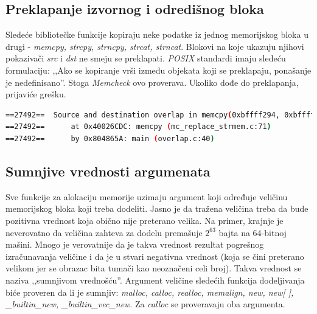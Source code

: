 \documentclass[12pt,oneside]{memoir}
\theoremstyle{plain}
\theoremstyle{definition}
\begin{document}
\subsection{Preklapanje izvornog i odredišnog bloka}
Sledeće bibliotečke funkcije kopiraju neke podatke iz jednog memorijskog bloka u drugi - \textit{memcpy, strcpy, strncpy, strcat, strncat}.  Blokovi na koje ukazuju njihovi pokazivači \textit{src} i \textit{dst} ne smeju se preklapati. \textit{POSIX} standardi imaju sledeću formulaciju: ,,Ako se kopiranje vrši između objekata koji se preklapaju, ponašanje je nedefinisano''.  Stoga \textit{Memcheck} ovo proverava. Ukoliko dođe do preklapanja, prijaviće grešku.

\begin{lstlisting}[style=terminal,caption={Primer ispisa greške preklapanja izvornog i odredišnog bloka \cite{Memcheck}}, label={lst:slika2.10},language={bash}] 
==27492==  Source and destination overlap in memcpy(0xbffff294, 0xbffff280, 21)
==27492==      at 0x40026CDC: memcpy (mc_replace_strmem.c:71)
==27492==      by 0x804865A: main (overlap.c:40)
\end{lstlisting}


\subsection{Sumnjive vrednosti argumenata}
Sve funkcije za alokaciju memorije uzimaju argument koji određuje veličinu memorijskog bloka koji treba dodeliti. Jasno je da tražena veličina treba da bude pozitivna vrednost koja obično nije preterano velika. Na primer, krajnje je neverovatno da veličina zahteva za dodelu premašuje ${2}^{63}$ bajta na 64-bitnoj mašini. Mnogo je verovatnije da je takva vrednost rezultat pogrešnog izračunavanja veličine i da je u stvari negativna vrednost (koja se čini preterano velikom jer se obrazac bita tumači kao neoznačeni celi broj). Takva vrednost se naziva ,,sumnjivom vrednošću''. Argument veličine sledećih funkcija dodeljivanja biće proveren da li je sumnjiv: \textit{malloc, calloc, realloc, memalign, new, new[ ], \_builtin\_new, \_builtin\_vec\_new}. Za \textit{calloc} se proveravaju oba argumenta.
\end{document}
